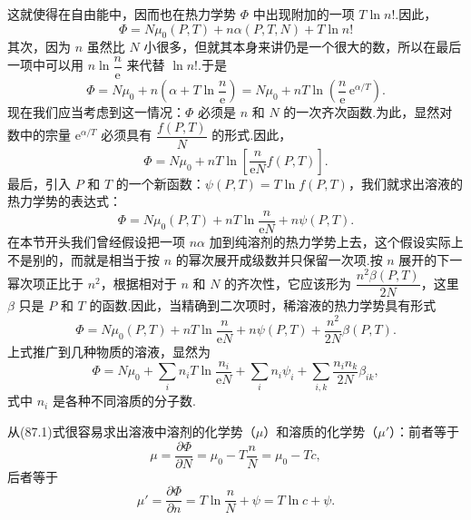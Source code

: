 这就使得在自由能中，因而也在热力学势 $\varPhi$ 中出现附加的一项 $T\ln n!$.因此，
\begin{equation*}
  \varPhi=N\mu_0(P,T)+n\alpha(P,T,N)+T\ln n!
\end{equation*}
其次，因为 $n$ 虽然比 $N$ 小很多，但就其本身来讲仍是一个很大的数，所以在最后一项中可以用 $n\ln\dfrac{n}{\mathrm{e}}$ 来代替 $\ln n!$.于是
\begin{equation*}
  \varPhi=N\mu_0+n\left(\alpha+T\ln\frac{n}{\mathrm{e}}\right)
  =N\mu_0+nT\ln\left(\frac{n}{\mathrm{e}}\,\mathrm{e}^{\alpha/T}\right).
\end{equation*}
现在我们应当考虑到这一情况：$\varPhi$ 必须是 $n$ 和 $N$ 的一次齐次函数.为此，显然对数中的宗量 $\mathrm{e}^{\alpha/T}$ 必须具有 $\dfrac{f(P,T)}{N}$ 的形式.因此，
\begin{equation*}
  \varPhi=N\mu_0+nT\ln\left[\frac{n}{\mathrm{e}N}f(P,T)\right].
\end{equation*}
最后，引入 $P$ 和 $T$ 的一个新函数：$\psi(P,T)=T\ln f(P,T)$，我们就求出溶液的热力学势的表达式：
\begin{equation}
  \varPhi=N\mu_0(P,T)+nT\ln\frac{n}{\mathrm{e}N}+n\psi(P,T).
\end{equation}
在本节开头我们曾经假设把一项 $n\alpha$ 加到纯溶剂的热力学势上去，这个假设实际上不是别的，而就是相当于按 $n$ 的幂次展开成级数并只保留一次项.按 $n$ 展开的下一幂次项正比于 $n^2$，根据相对于 $n$ 和 $N$ 的齐次性，它应该形为 $\dfrac{n^2\beta(P,T)}{2N}$，这里 $\beta$ 只是 $P$ 和 $T$ 的函数.因此，当精确到二次项时，稀溶液的热力学势具有形式
\begin{equation}
  \varPhi=N\mu_0(P,T)+nT\ln\frac{n}{\mathrm{e}N}
  +n\psi(P,T)+\frac{n^2}{2N}\beta(P,T).
\end{equation}
上式推广到几种物质的溶液，显然为
\begin{equation}
  \varPhi=N\mu_0+\sum_in_iT\ln\frac{n_i}{\mathrm{e}N}
  +\sum_in_i\psi_i+\sum_{i,k}\frac{n_in_k}{2N}\beta_{ik},
\end{equation}
式中 $n_i$ 是各种不同溶质的分子数.

从(87.1)式很容易求出溶液中溶剂的化学势（$\mu$）和溶质的化学势（$\mu'$）：前者等于
\begin{equation}
  \mu=\frac{\partial\varPhi}{\partial N}
  =\mu_0-T\frac{n}{N}=\mu_0-Tc,
\end{equation}
后者等于
\begin{equation}
  \mu'=\frac{\partial\varPhi}{\partial n}
  =T\ln\frac{n}{N}+\psi=T\ln c+\psi.
\end{equation}

